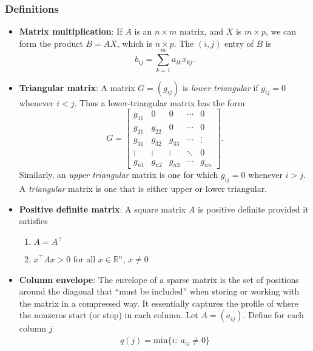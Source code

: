 \documentclass{report}
\begin{document}
    \subsubsection{Definitions}
    \begin{itemize}
        \item \textbf{Matrix multiplication}: If $A$ is an $n \times m$ matrix, and $X$ is $m \times p$, we can form the product $B = AX$, which is $n \times p$. The $(i,j)$ entry of $B$ is
        \[
            b_{ij} = \sum_{k=1}^{m} a_{ik} x_{kj}.
        \]
    \item \textbf{Triangular matrix}:
        A matrix $G = (g_{ij})$ is \textit{lower triangular} if $g_{ij} = 0$ whenever $i < j$. 
        Thus a lower-triangular matrix has the form
        \[
            G =
            \begin{bmatrix}
                g_{11} & 0      & 0      & \cdots & 0 \\
                g_{21} & g_{22} & 0      & \cdots & 0 \\
                g_{31} & g_{32} & g_{33} & \cdots & \vdots \\
                \vdots & \vdots & \vdots & \ddots & 0 \\
                g_{n1} & g_{n2} & g_{n3} & \cdots & g_{nn}
            \end{bmatrix}.
        \]
        Similarly, an \textit{upper triangular} matrix is one for which $g_{ij} = 0$ whenever $i > j$. 
        A \textit{triangular} matrix is one that is either upper or lower triangular.
    \item \textbf{Positive definite matrix}: A square matrix $A$ is positive definite provided it satisfies
        \begin{enumerate}
            \item $A = A^{\top} $
            \item $x^{\top}Ax > 0$ for all $x\in \mathbb{R}^{n}$, $x\ne 0$
        \end{enumerate}
    \item \textbf{Column envelope}: The envelope of a sparse matrix is the set of positions around the diagonal that “must be included” when storing or working with the matrix in a compressed way.
        \bigbreak \noindent 
        It essentially captures the profile of where the nonzeros start (or stop) in each column.
        \bigbreak \noindent 
        Let $A  = (a_{ij})$. Define for each column $j$
        \begin{align*}
            q(j) = \text{min}\{i:\ a_{ij} \ne 0\}

\end{align*}
\end{itemize}
\end{document}
